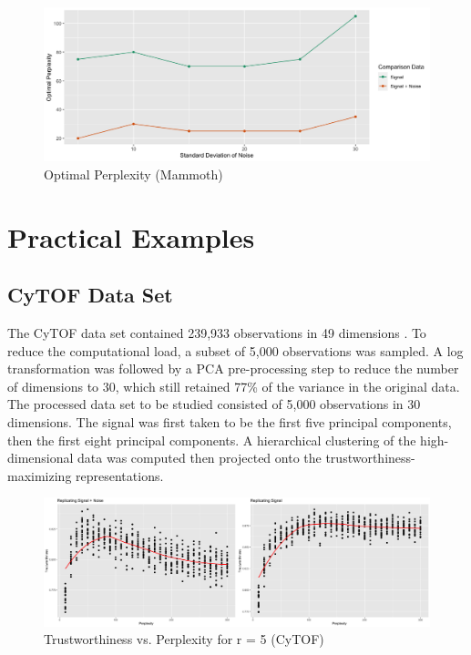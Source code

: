 \documentclass{article}
\begin{document}
\begin{figure}[H]
\centering
\includegraphics[scale=0.37]{optimal_perp_mammoth}
\caption{Optimal Perplexity (Mammoth)}
\end{figure}

\section{Practical Examples}

\subsection{CyTOF Data Set}
The CyTOF data set contained 239,933 observations in 49 dimensions \cite{CyTOF data}. To reduce the computational load, a subset of 5,000 observations was sampled. A log transformation was followed by a PCA pre-processing step to reduce the number of dimensions to 30, which still retained 77\% of the variance in the original data. The processed data set to be studied consisted of 5,000 observations in 30 dimensions. The signal was first taken to be the first five principal components, then the first eight principal components. A hierarchical clustering of the high-dimensional data was computed then projected onto the trustworthiness-maximizing representations.

\begin{figure}[H]
\centering
\includegraphics[scale=0.205]{trust_plot_CyTOF}
\caption{Trustworthiness vs. Perplexity for r = 5 (CyTOF)}
\end{figure}
\end{document}
